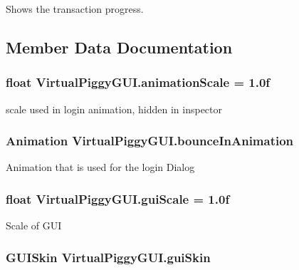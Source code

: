 Shows the transaction progress. 



\subsection{Member Data Documentation}
\hypertarget{class_virtual_piggy_g_u_i_adb759917612421d1475ba86a7d6dc056}{
\subsubsection[{animation\-Scale}]{\setlength{\rightskip}{0pt plus 5cm}float Virtual\-Piggy\-G\-U\-I.\-animation\-Scale = 1.\-0f}}\label{class_virtual_piggy_g_u_i_adb759917612421d1475ba86a7d6dc056}


scale used in login animation, hidden in inspector 

\hypertarget{class_virtual_piggy_g_u_i_a0fcb59d1bf578d056d0bc123a89e75f0}{
\subsubsection[{bounce\-In\-Animation}]{\setlength{\rightskip}{0pt plus 5cm}Animation Virtual\-Piggy\-G\-U\-I.\-bounce\-In\-Animation}}\label{class_virtual_piggy_g_u_i_a0fcb59d1bf578d056d0bc123a89e75f0}


Animation that is used for the login Dialog 

\hypertarget{class_virtual_piggy_g_u_i_acef2dc6ac83a1dd3b72796fcce046934}{
\subsubsection[{gui\-Scale}]{\setlength{\rightskip}{0pt plus 5cm}float Virtual\-Piggy\-G\-U\-I.\-gui\-Scale = 1.\-0f}}\label{class_virtual_piggy_g_u_i_acef2dc6ac83a1dd3b72796fcce046934}


Scale of G\-U\-I 

\hypertarget{class_virtual_piggy_g_u_i_a6d7bdaef0dd72024639f51008c202130}{
\subsubsection[{gui\-Skin}]{\setlength{\rightskip}{0pt plus 5cm}G\-U\-I\-Skin Virtual\-Piggy\-G\-U\-I.\-gui\-Skin}}\label{class_virtual_piggy_g_u_i_a6d7bdaef0dd72024639f51008c202130}


